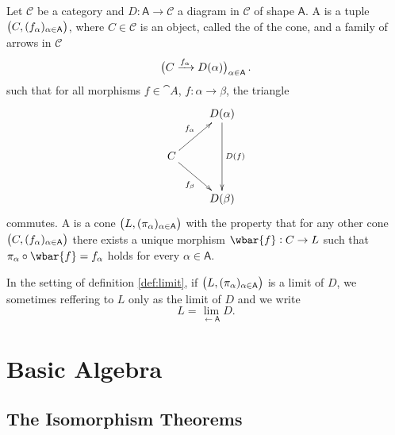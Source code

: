 \begin{definition}
	Let $\mathcal{C}$ be a category and $D : \mathsf{A} \to \mathcal{C}$ a diagram in $\mathcal{C}$ of shape $\mathsf{A}$. A  is a tuple $\del[1]{C,(f_\alpha)_{\alpha \in \mathsf{A}}}$, where $C \in \mathcal{C}$ is an object, called the  of the cone, and a family of arrows in $\mathcal{C}$
	\begin{equation}
		\del[1]{C \xrightarrow{f_\alpha} D(\alpha)}_{\alpha \in \mathsf{A}}.
	\end{equation}
	\noindent such that for all morphisms $f \in \cat{A}$, $f : \alpha \to \beta$, the triangle
	\begin{equation*}
		\xymatrix{
			& D(\alpha) \ar[dd]^{D(f)}\\
			C \ar[ur]^{f_\alpha}\ar[dr]_{f_\beta}\\
			& D(\beta)}
	\end{equation*}
	\noindent commutes. A  is a cone $\del[1]{L, (\pi_\alpha)_{\alpha \in \mathsf{A}}}$ with the property that for any other cone $\del[1]{C,(f_\alpha)_{\alpha \in \mathsf{A}}}$ there exists a unique morphism $\wbar{f} : C \to L$ such that $\pi_\alpha \circ \wbar{f} = f_\alpha$ holds for every $\alpha \in \mathsf{A}$.
	\label{def:limit}
\end{definition}

\begin{remark}
	In the setting of definition \ref{def:limit}, if $\del[1]{L, (\pi_\alpha)_{\alpha \in \cat{A}}}$ is a limit of $D$, we sometimes reffering to $L$ only as the limit of $D$ and we write
	\begin{equation}
		L = \lim_{\leftarrow \mathsf{A}} D.
	\end{equation}
\end{remark}

\section*{Basic Algebra}
\subsection*{The Isomorphism Theorems}
